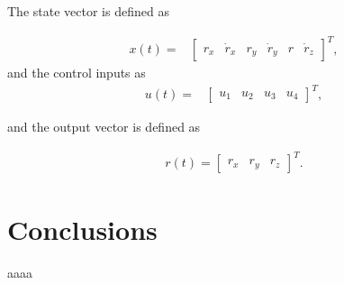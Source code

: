 The state vector is defined as

\begin{align*}
x(t)=&
\begin{bmatrix}
r_x & \dot{r}_x & r_y & \dot{r}_y & r &\dot{r}_z 
\end{bmatrix}^T,
\end{align*}
and the control inputs as
\begin{align*}
u(t)=&
\begin{bmatrix}
u_1 & u_2 &u_3 & u_4
\end{bmatrix}^T,
\end{align*}

and the output vector is defined as

\begin{align*}
r(t)=
\begin{bmatrix}
r_{x} & r_{y} & r_{z}
\end{bmatrix}^T.
\end{align*}

\section{Conclusions}
aaaa


